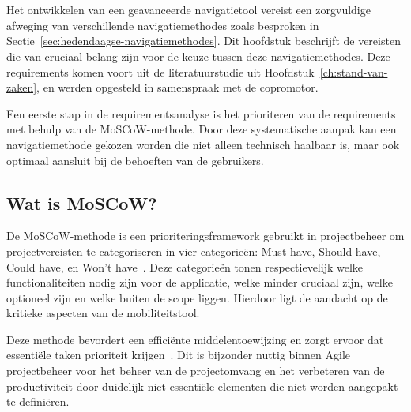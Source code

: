 
\chapter{}%
\label{ch:bepalen-van-de-geschikte-navigatiemethode}


Het ontwikkelen van een geavanceerde navigatietool vereist een zorgvuldige afweging van verschillende navigatiemethodes zoals besproken in Sectie~\ref{sec:hedendaagse-navigatiemethodes}. Dit hoofdstuk beschrijft de vereisten die van cruciaal belang zijn voor de keuze tussen deze navigatiemethodes. Deze requirements komen voort uit de literatuurstudie uit Hoofdstuk~\ref{ch:stand-van-zaken}, en werden opgesteld in samenspraak met de copromotor.

Een eerste stap in de requirementsanalyse is het prioriteren van de requirements met behulp van de MoSCoW-methode. Door deze systematische aanpak kan een navigatiemethode gekozen worden die niet alleen technisch haalbaar is, maar ook optimaal aansluit bij de behoeften van de gebruikers.

\section{Wat is MoSCoW?}

De MoSCoW-methode is een prioriteringsframework gebruikt in projectbeheer om projectvereisten te categoriseren in vier categorieën: Must have, Should have, Could have, en Won't have~\autocite{Brush2023}. Deze categorieën tonen respectievelijk welke functionaliteiten nodig zijn voor de applicatie, welke minder cruciaal zijn, welke optioneel zijn en welke buiten de scope liggen. Hierdoor ligt de aandacht op de kritieke aspecten van de mobiliteitstool.

Deze methode bevordert een efficiënte middelentoewijzing en zorgt ervoor dat essentiële taken prioriteit krijgen~\autocite{Brush2023}. Dit is bijzonder nuttig binnen Agile projectbeheer voor het beheer van de projectomvang en het verbeteren van de productiviteit door duidelijk niet-essentiële elementen die niet worden aangepakt te definiëren.


